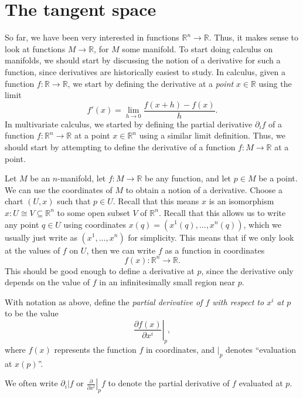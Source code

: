 \section{The tangent space}

So far, we have been very interested in functions $\mathbb{R} ^n \to \mathbb{R} $. Thus, it makes sense to look at functions $M\to \mathbb{R} $, for $M$ some manifold. To start doing calculus on manifolds, we should start by discussing the notion of a derivative for such a function, since derivatives are historically easiest to study. In calculus, given a function $f : \mathbb{R} \to \mathbb{R} $, we start by defining the derivative at a \emph{point} $x\in\mathbb{R}$ using the limit
\[
	f'(x) = \lim_{h\to 0} \frac{f(x+h) - f(x)}{h} 
.\]
In multivariate calculus, we started by defining the partial derivative $\partial _if$ of a function $f : \mathbb{R} ^n \to \mathbb{R} $ at a point $x\in\mathbb{R} ^n$ using a similar limit definition. Thus, we should start by attempting to define the derivative of a function $f: M \to \mathbb{R} $ at a point.

Let $M$ be an $n$-manifold, let $f : M \to \mathbb{R} $ be any function, and let $p\in M$ be a point. We can use the coordinates of $M$ to obtain a notion of a derivative. Choose a chart $(U,x)$ such that $p\in U$. Recall that this means $x$ is an isomorphism $x : U \cong V \subseteq \mathbb{R} ^n$ to some open subset $V$ of $\mathbb{R} ^n$. Recall that this allows us to write any point $q\in U$ using coordinates $x(q) = (x^1(q), \ldots , x^n(q))$, which we usually just write as $(x^1, \ldots , x^n)$ for simplicity. This means that if we only look at the values of $f$ on $U$, then we can write $f$ as a function in coordinates
\[
	f(x) : \mathbb{R} ^n \to \mathbb{R} 
.\]
This should be good enough to define a derivative at $p$, since the derivative only depends on the value of $f$ in an infinitesimally small region near $p$.
\begin{definition}\label{dfn:2-1}
	With notation as above, define the \emph{partial derivative of $f$ with respect to $x^i$ at $p$} to be the value
	\[
		\left.\frac{\partial f(x)}{\partial x^i} \right|_{p} ,
	\]
	where $f(x)$ represents the function $f$ in coordinates, and $|_p$ denotes ``evaluation at $x(p)$''.
\end{definition}

\begin{notation}
	We often write $\partial _i|f$ or $\left.\frac{\partial }{\partial x^i} \right|_pf$ to denote the partial derivative of $f$ evaluated at $p$.
\end{notation}

